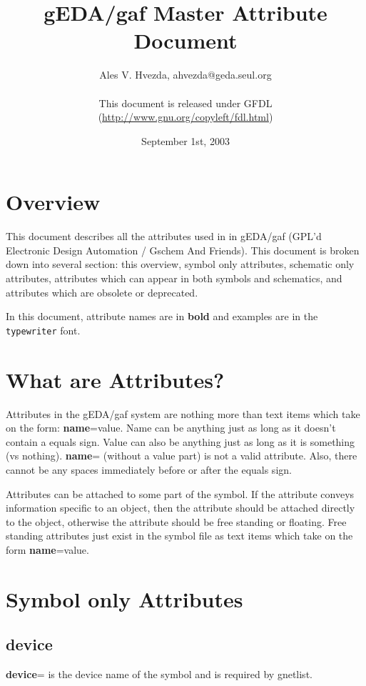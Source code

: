 \documentclass{article}
\title{gEDA/gaf Master Attribute Document}
\author{Ales V. Hvezda, ahvezda@geda.seul.org\\
	\\
	This document is released under GFDL\\ 
        (\url{http://www.gnu.org/copyleft/fdl.html})}
\date{September 1st, 2003}
\begin{document}
\maketitle
\newpage

\tableofcontents
\newpage


\section{Overview}

This document describes all the attributes used in in gEDA/gaf (GPL'd
Electronic Design Automation / Gschem And Friends).  This document
is broken down into several section: this overview, symbol only
attributes, schematic only attributes, attributes which can appear
in both symbols and schematics, and attributes which are obsolete or
deprecated.

In this document, attribute names are in {\bf bold} and examples
are in the \texttt{typewriter} font.

\section{What are Attributes?}

Attributes in the gEDA/gaf system are nothing more than text items
which take on the form: {\bf name}=value.  Name can be anything just as long
as it doesn't contain a equals sign.  Value can also be anything just
as long as it is something (vs nothing).  {\bf name}= (without a value part)
is not a valid attribute.  Also, there cannot be any spaces immediately
before or after the equals sign.

Attributes can be attached to some part of the symbol.  If the attribute
conveys information specific to an object, then the attribute should
be attached directly to the object, otherwise the attribute should be
free standing or floating.  Free standing attributes just exist in the
symbol file as text items which take on the form {\bf name}=value.

\newpage

\section{Symbol only Attributes}


\subsection{\bf device\label{device}}
{\bf device}= is the device name of the symbol and is required by gnetlist.  
\end{document}
